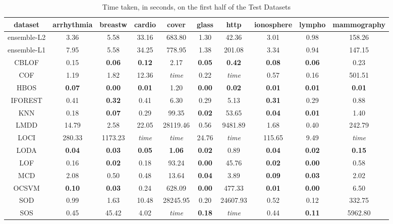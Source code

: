 \begin{table*}[!t]
\renewcommand{\arraystretch}{1.25}
\caption{Time taken, in seconds, on the first half of the Test Datasets}
\label{table:results:test-time-1}
\centering
\begin{tabular}{|c|c|c|c|c|c|c|c|c|c|}
    \hline
    \textbf{dataset} & \textbf{arrhythmia} & \textbf{breastw} & \textbf{cardio} & \textbf{cover} & \textbf{glass} & \textbf{http} & \textbf{ionosphere} & \textbf{lympho} & \textbf{mammography} \\
    \hline
    ensemble-L2 & 3.36 & 5.58 & 33.16 & 683.80 & 1.30 & 42.36 & 3.01 & 0.98 & 158.26 \\
    \hline
    ensemble-L1 & 7.95 & 5.58 & 34.25 & 778.95 & 1.38 & 201.08 & 3.34 & 0.94 & 147.15 \\
    \hline
    CBLOF & 0.15 & \bfseries 0.06 & \bfseries 0.12 & 2.17 & \bfseries 0.05 & \bfseries 0.42 & \bfseries 0.08 & \bfseries 0.06 & 0.23 \\
    \hline
    COF & 1.19 & 1.82 & 12.36 & \textit{time} & 0.22 & \textit{time} & 0.57 & 0.16 & 501.51 \\
    \hline
    HBOS & \bfseries 0.07 & \bfseries 0.00 & \bfseries 0.01 & 1.20 & \bfseries 0.00 & \bfseries 0.02 & \bfseries 0.01 & \bfseries 0.01 & \bfseries 0.01 \\
    \hline
    IFOREST & 0.41 & \bfseries 0.32 & 0.41 & 6.30 & 0.29 & 5.13 & \bfseries 0.31 & 0.29 & 0.88 \\
    \hline
    KNN & 0.18 & \bfseries 0.07 & 0.29 & 99.35 & \bfseries 0.02 & 53.65 & \bfseries 0.04 & \bfseries 0.01 & 1.40 \\
    \hline
    LMDD & 14.79 & 2.58 & 22.05 & 28119.46 & 0.56 & 9481.89 & 1.68 & 0.40 & 242.79 \\
    \hline
    LOCI & 280.33 & 1173.23 & \textit{time} & \textit{time} & 24.76 & \textit{time} & 115.65 & 9.49 & \textit{time} \\
    \hline
    LODA & \bfseries 0.04 & \bfseries 0.03 & \bfseries 0.05 & \bfseries 1.06 & \bfseries 0.02 & 0.89 & \bfseries 0.04 & \bfseries 0.02 & \bfseries 0.15 \\
    \hline
    LOF & 0.16 & \bfseries 0.02 & 0.18 & 93.24 & \bfseries 0.00 & 45.76 & \bfseries 0.02 & \bfseries 0.00 & 0.58 \\
    \hline
    MCD & 2.08 & 0.50 & 0.48 & 13.64 & \bfseries 0.04 & 3.89 & \bfseries 0.09 & \bfseries 0.03 & 2.02 \\
    \hline
    OCSVM & \bfseries 0.10 & \bfseries 0.03 & 0.24 & 628.09 & \bfseries 0.00 & 477.33 & \bfseries 0.01 & \bfseries 0.00 & 6.50 \\
    \hline
    SOD & 0.99 & 1.63 & 10.48 & 28245.95 & 0.20 & 24607.93 & 0.52 & 0.12 & 332.75 \\
    \hline
    SOS & 0.45 & 45.42 & 4.02 & \textit{time} & \bfseries 0.18 & \textit{time} & 0.44 & \bfseries 0.11 & 5962.80 \\
    \hline
\end{tabular}
\end{table*}


